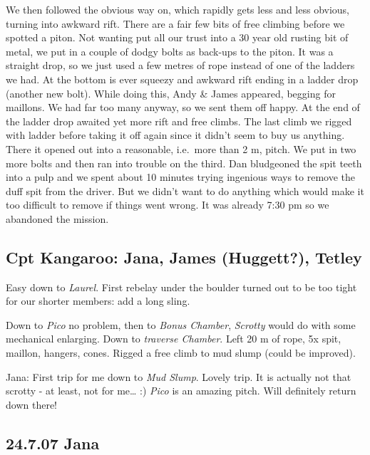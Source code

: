 We then followed the obvious way on, which rapidly gets less and less
obvious, turning into awkward rift. There are a fair few bits of free
climbing before we spotted a piton. Not wanting put all our trust into a
30 year old rusting bit of metal, we put in a couple of dodgy bolts as
back-ups to the piton. It was a straight drop, so we just used a few
metres of rope instead of one of the ladders we had. At the bottom is
ever squeezy and awkward rift ending in a ladder drop (another new
bolt). While doing this, Andy \& James appeared, begging for maillons.
We had far too many anyway, so we sent them off happy. At the end of the
ladder drop awaited yet more rift and free climbs. The last climb we
rigged with ladder before taking it off again since it didn't seem to
buy us anything. There it opened out into a reasonable, i.e.~more than 2
m, pitch. We put in two more bolts and then ran into trouble on the
third. Dan bludgeoned the spit teeth into a pulp and we spent about 10
minutes trying ingenious ways to remove the duff spit from the driver.
But we didn't want to do anything which would make it too difficult to
remove if things went wrong. It was already 7:30 pm so we abandoned the
mission.


\hypertarget{cpt-kangaroo-jana-james-huggett-tetley}{%
\subsection{Cpt Kangaroo: Jana, James (Huggett?),
Tetley}\label{cpt-kangaroo-jana-james-huggett-tetley}}

Easy down to \emph{Laurel}. First rebelay under the boulder turned out
to be too tight for our shorter members: add a long sling.

Down to \emph{Pico} no problem, then to \emph{Bonus Chamber},
\emph{Scrotty} would do with some mechanical enlarging. Down to
\emph{traverse Chamber}. Left 20 m of rope, 5x spit, maillon, hangers,
cones. Rigged a free climb to mud slump (could be improved).

Jana: First trip for me down to \emph{Mud Slump}. Lovely trip. It is
actually not that scrotty - at least, not for me\ldots{} :) \emph{Pico}
is an amazing pitch. Will definitely return down there!

\hypertarget{jana}{%
\subsection{24.7.07 Jana}\label{jana}}

